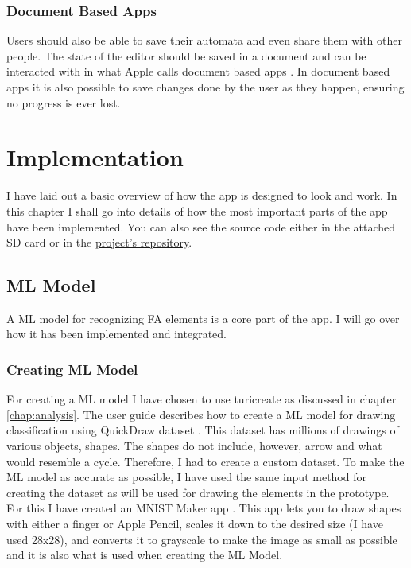 \subsection{Document Based Apps}

Users should also be able to save their automata and even share them with other people. The state of the editor should be saved in a document and can be interacted with in what Apple calls document based apps \cite{document-based}. In document based apps it is also possible to save changes done by the user as they happen, ensuring no progress is ever lost.

\chapter{Implementation}
\label{chap:implementation}

I have laid out a basic overview of how the app is designed to look and work. In this chapter I shall go into details of how the most important parts of the app have been implemented. You can also see the source code either in the attached SD card or in the \href{https://github.com/fortmarek/automata-editor}{project's repository}.

\section{ML Model}

A ML model for recognizing FA elements is a core part of the app. I will go over how it has been implemented and integrated.

\subsection{Creating ML Model}

For creating a ML model I have chosen to use turicreate \cite{turicreate} as discussed in chapter \ref{chap:analysis}. The user guide \cite{drawing-classification} describes how to create a ML model for drawing classification using QuickDraw dataset \cite{quickdraw}. This dataset has millions of drawings of various objects, shapes. The shapes do not include, however, arrow and what would resemble a cycle. Therefore, I had to create a custom dataset. To make the ML model as accurate as possible, I have used the same input method for creating the dataset as will be used for drawing the elements in the prototype. For this I have created an MNIST Maker app \cite{mnist-maker}. This app lets you to draw shapes with either a finger or Apple Pencil, scales it down to the desired size (I have used 28x28), and converts it to grayscale to make the image as small as possible and it is also what is used when creating the ML Model.

